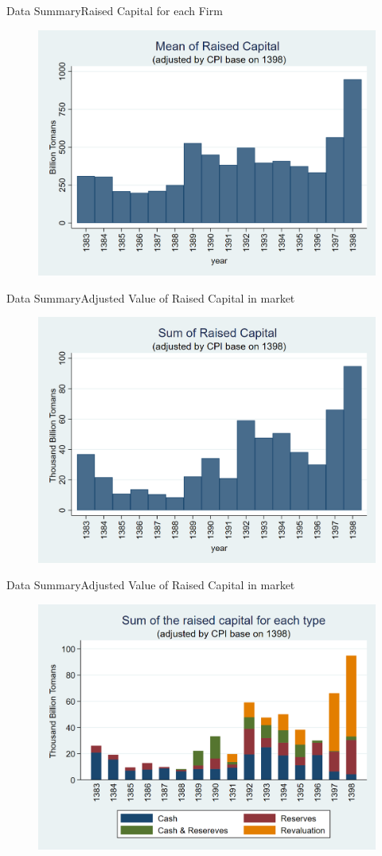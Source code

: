 \documentclass{beamer}
\begin{document}
	\begin{frame}{Data Summary}{Raised Capital for each Firm}
		\begin{figure}
			\centering
			\includegraphics[width=0.7\linewidth]{Output/MeanCapRaiseAdjusted.png}
			\label{fig:meancapraise}
		\end{figure}
	\end{frame}
	
	\begin{frame}{Data Summary}{Adjusted Value of Raised Capital in market}
		\begin{figure}
			\centering
			\includegraphics[width=0.7\linewidth]{Output/SumCapRaiseAdjusted.png}
			\label{fig:SumCapRaise}
		\end{figure}
	\end{frame}
	
	\begin{frame}{Data Summary}{Adjusted Value of Raised Capital in market}
		\begin{figure}
			\centering
			\includegraphics[width=0.7\linewidth]{Output/SumCapRaiseAdjustedEachtype}
			\label{fig:SumCapRaise2}
		\end{figure}
		
	\end{frame}
	
\end{document}
